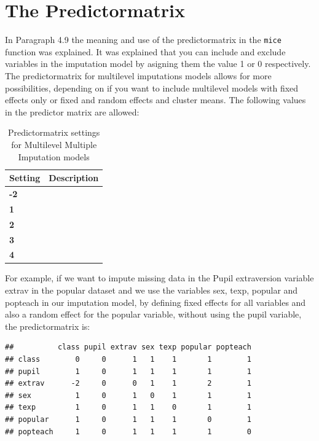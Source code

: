 \documentclass[
]{book}
\begin{document}
\hypertarget{the-predictormatrix}{%
\section{The Predictormatrix}\label{the-predictormatrix}}

In Paragraph 4.9 the meaning and use of the predictormatrix in the \texttt{mice} function was explained. It was explained that you can include and exclude variables in the imputation model by asigning them the value 1 or 0 respectively. The predictormatrix for multilevel imputations models allows for more possibilities, depending on if you want to include multilevel models with fixed effects only or fixed and random effects and cluster means. The following values in the predictor matrix are allowed:

\begin{table}

\caption{\label{tab:unnamed-chunk-111}Predictormatrix settings for Multilevel Multiple Imputation models}
\centering
\begin{tabular}[t]{>{}l||>{\raggedright\arraybackslash}p{30em}}
\hline
Setting & Description\\
\hline
\textbf{-2} & \cellcolor{white}{to indicate the cluster variable}\\
\hline
\textbf{1} & \cellcolor{white}{imputation model with a fixed effect and a random intercept.}\\
\hline
\textbf{2} & \cellcolor{white}{imputation model with a fixed effect, random intercept and random slope.}\\
\hline
\textbf{3} & \cellcolor{white}{imputation model with a fixed effect, random intercept and cluster means.}\\
\hline
\textbf{4} & \cellcolor{white}{imputation model with a fixed effect, random intercept and random slope and cluster means.}\\
\hline
\end{tabular}
\end{table}

For example, if we want to impute missing data in the Pupil extraversion variable extrav in the popular dataset and we use the variables sex, texp, popular and popteach in our imputation model, by defining fixed effects for all variables and also a random effect for the popular variable, without using the pupil variable, the predictormatrix is:

\begin{verbatim}
##          class pupil extrav sex texp popular popteach
## class        0     0      1   1    1       1        1
## pupil        1     0      1   1    1       1        1
## extrav      -2     0      0   1    1       2        1
## sex          1     0      1   0    1       1        1
## texp         1     0      1   1    0       1        1
## popular      1     0      1   1    1       0        1
## popteach     1     0      1   1    1       1        0
\end{verbatim}
\end{document}
